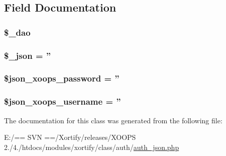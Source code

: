\subsection{Field Documentation}
\hypertarget{class_xortify_auth_json_a12a029c610f699b4b25e79a1f64a3485}{
\subsubsection[{\$\-\_\-dao}]{\setlength{\rightskip}{0pt plus 5cm}\$\-\_\-dao}}\label{class_xortify_auth_json_a12a029c610f699b4b25e79a1f64a3485}
\hypertarget{class_xortify_auth_json_a94787b37d92a2dee02534eed4f316589}{
\subsubsection[{\$\-\_\-json}]{\setlength{\rightskip}{0pt plus 5cm}\$\-\_\-json = ''}}\label{class_xortify_auth_json_a94787b37d92a2dee02534eed4f316589}
\hypertarget{class_xortify_auth_json_a7af311f07c1c09254920e6ac0cefe9a9}{
\subsubsection[{\$json\-\_\-xoops\-\_\-password}]{\setlength{\rightskip}{0pt plus 5cm}\$json\-\_\-xoops\-\_\-password = ''}}\label{class_xortify_auth_json_a7af311f07c1c09254920e6ac0cefe9a9}
\hypertarget{class_xortify_auth_json_ac058687d82a56fb93513e7e58c4ec391}{
\subsubsection[{\$json\-\_\-xoops\-\_\-username}]{\setlength{\rightskip}{0pt plus 5cm}\$json\-\_\-xoops\-\_\-username = ''}}\label{class_xortify_auth_json_ac058687d82a56fb93513e7e58c4ec391}


The documentation for this class was generated from the following file\-:\begin{DoxyCompactItemize}
\item 
E\-:/== S\-V\-N ==/\-Xortify/releases/\-X\-O\-O\-P\-S 2./4./htdocs/modules/xortify/class/auth/\hyperlink{auth__json_8php}{auth\-\_\-json.\-php}\end{DoxyCompactItemize}
